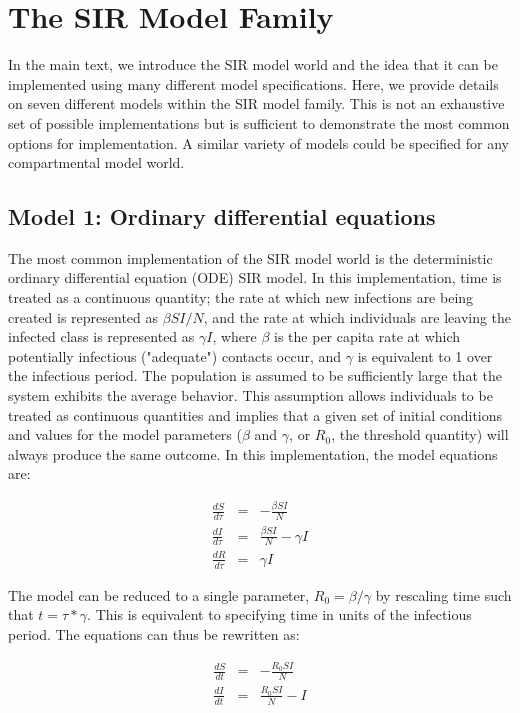 \documentclass[margin,line,11pt]{article}
\begin{document}
\section{The SIR Model Family}

In the main text, we introduce the SIR model world and the idea that it can be implemented using many different model specifications. 
Here, we provide details on seven different models within the SIR model family. 
This is not an exhaustive set of possible implementations but is sufficient to demonstrate the most common options for implementation. 
A similar variety of models could be specified for any compartmental model world.

\subsection{Model 1: Ordinary differential equations}

The most common implementation of the SIR model world is the deterministic ordinary differential equation (ODE) SIR model. 
In this implementation, time is treated as a continuous quantity; the rate at which new infections are being created is represented as $\beta S I / N$, and the rate at which individuals are leaving the infected class is represented as $\gamma I$, where $\beta$ is the per capita rate at which potentially infectious ("adequate") contacts occur, and $\gamma$ is equivalent to 1 over the infectious period. 
The population is assumed to be sufficiently large that the system exhibits the average behavior. 
This assumption allows individuals to be treated as continuous quantities and implies that a given set of initial conditions and values for the model parameters ($\beta$ and $\gamma$, or $R_0$, the threshold quantity) will always produce the same outcome. 
In this implementation, the model equations are:

\begin{eqnarray*}
\frac{dS}{d\tau} &=& -\frac{\beta S I}{N}\\
\frac{dI}{d\tau} &=& \frac{\beta S I}{N} - \gamma I \\
\frac{dR}{d\tau} &=& \gamma I
\end{eqnarray*}

\noindent The model can be reduced to a single parameter, $R_0 = \beta / \gamma$ by rescaling time such that $t = \tau * \gamma$. 
This is equivalent to specifying time in units of the infectious period. The equations can thus be rewritten as:

\begin{eqnarray}
\frac{dS}{dt} &=& -\frac{R_0 S I}{N}\label{eqn:1} \\
\frac{dI}{dt} &=& \frac{R_0 S I}{N} - I\label{eqn:2}
\end{eqnarray}
\end{document}
